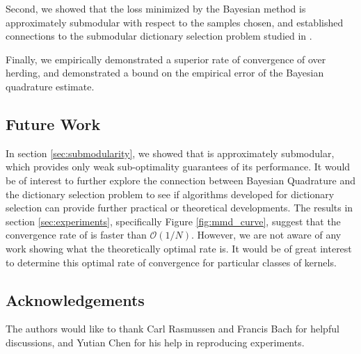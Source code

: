 \documentclass[]{article}
\begin{document}
Second, we showed that the loss minimized by the Bayesian method is approximately submodular with respect to the samples chosen, and established connections to the submodular dictionary selection problem studied in \citep{KrauseCevher10}.

Finally, we empirically demonstrated a superior rate of convergence of \sbq{} over herding, and demonstrated a bound on the empirical error of the Bayesian quadrature estimate.

\subsection{Future Work}

In section \ref{sec:submodularity}, we showed that \sbq{} is approximately submodular, which provides only weak sub-optimality guarantees of its performance. It would be of interest to further explore the connection between Bayesian Quadrature and the dictionary selection problem to see if algorithms developed for dictionary selection can provide further practical or theoretical developments. The results in section \ref{sec:experiments}, specifically Figure \ref{fig:mmd_curve}, suggest that the convergence rate of \sbq{} is faster than $\mathcal{O}(1/N)$. However, we are not aware of any work showing what the theoretically optimal rate is. It would be of great interest to determine this optimal rate of convergence for particular classes of kernels.

\subsection*{Acknowledgements}

The authors would like to thank Carl Rasmussen and Francis Bach for helpful discussions, and Yutian Chen for his help in reproducing experiments.
\end{document}
